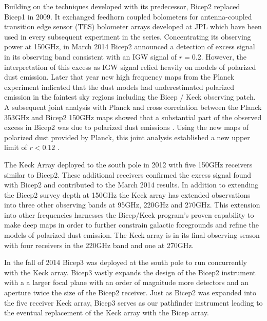 \documentclass[12pt]{article}
\begin{document}
Building on the techniques developed with its predecessor, Bicep2 replaced
Bicep1 in 2009. It exchanged feedhorn coupled bolometers for antenna-coupled
transition edge sensor (TES) bolometer arrays developed at JPL which have been
used in every subsequent experiment in the series. Concentrating its observing
power at 150GHz, in March 2014 Bicep2 announced a detection of excess signal
in its observing band consistent with an IGW signal of $r=0.2$\cite{cite:BK1}.
However, the interpretation of this excess as IGW signal relied heavily on
models of polarized dust emission. Later that year new high frequency maps from the Planck experiment
indicated that the dust models had underestimated polarized emission in the
faintest sky regions \cite{cite:PlanckXIX} including the Bicep / Keck
observing patch. A subsequent joint analysis with Planck and cross correlation
between the Planck 353GHz and Bicep2 150GHz maps showed that a substantial
part of the observed excess in Bicep2 was due to polarized dust emissions
\cite{cite:BKP}. Using the new maps of polarized dust provided by Planck, this
joint analysis established a new upper limit of $r<0.12$ \cite{cite:BKP}.

The Keck Array deployed to the south pole in 2012 with five 150GHz receivers
similar to Bicep2. These additional receivers confirmed the excess signal
found with Bicep2 and contributed to the March 2014 results. In addition to
extending the Bicep2 survey depth at 150GHz the Keck array has extended
observations into three other observing bands at 95GHz, 220GHz and 270GHz.
This extension into other frequencies harnesses the Bicep/Keck program's
proven capability to make deep maps in order to further constrain galactic foregrounds
and refine the models of polarized dust emission. The Keck array is in its
final observing season with four receivers in the 220GHz band and one at
270GHz.

In the fall of 2014 Bicep3 was deployed at the south pole to run concurrently
with the Keck array. Bicep3 vastly expands the design of the Bicep2 instrument with a
a larger focal plane with an order of magnitude more detectors and an aperture
twice the size of the Bicep2 receiver. Just as Bicep2 was expanded into the
five receiver Keck array, Bicep3 serves as our pathfinder instrument leading
to the eventual replacement of the Keck array with the Bicep array.
\end{document}
